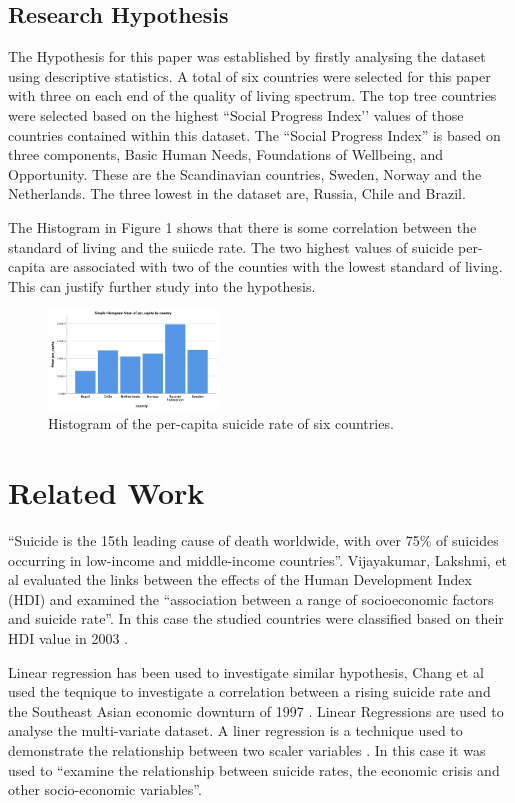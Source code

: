 \documentclass[conference]{IEEEtran}
\begin{document}
\subsection{Research Hypothesis}
The Hypothesis for this paper was established by firstly analysing the dataset using descriptive statistics.
A total of six countries were selected for this paper with three on each end of the quality of living spectrum.
The top tree countries were selected based on the highest ``Social Progress Index’’ values of those countries contained within this dataset.
The ``Social Progress Index'' is based on three components, Basic Human Needs, Foundations of Wellbeing, and Opportunity\cite{high_standard_living}.
These are the Scandinavian countries, Sweden, Norway and the Netherlands.
The three lowest in the dataset are, Russia, Chile and Brazil.

The Histogram in Figure 1 shows that there is some correlation between the standard of living and the suiicde rate.
The two highest values of suicide per-capita are associated with two of the counties with the lowest standard of living.
This can justify further study into the hypothesis.

    \begin{figure}[ht]
        \centering
        \includegraphics[width=0.4\textwidth]{percapita_bar}
        \caption{Histogram of the per-capita suicide rate of six countries.}
    \end{figure}

\section{Related Work}
``Suicide is the 15th leading cause of death worldwide, with over 75\% of suicides occurring in low-income and middle-income countries''\cite{sui_low_income}.
Vijayakumar, Lakshmi, et al evaluated the links between the effects of the Human Development Index (HDI) and examined the
``association between a range of socioeconomic factors and suicide rate''.
In this case the studied countries were classified based on their HDI value in 2003 \cite{Sui_in_developing}.

Linear regression has been used to investigate similar hypothesis, Chang et al used the teqnique to investigate a 
correlation between a rising suicide rate and the Southeast Asian economic downturn of 1997 \cite{SEAsia_sui}.
Linear Regressions are used to analyse the multi-variate dataset. A liner regression is a technique used to demonstrate the relationship between two scaler variables \cite{stats_models_book}. 
In this case it was used to ``examine the relationship between suicide rates, the economic crisis and other socio-economic variables''\cite{SEAsia_sui}.
\end{document}
